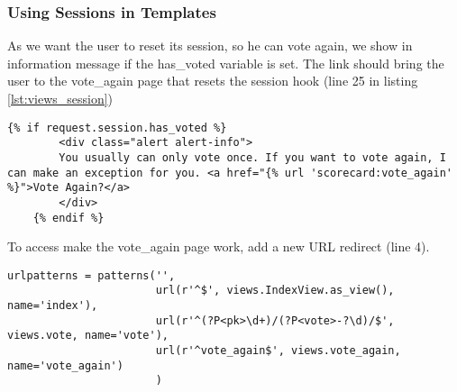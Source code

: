 \subsubsection{Using Sessions in Templates}
As we want the user to reset its session, so he can vote again, we show in information message if the has\_voted variable is set. The link should bring the user to the vote\_again page that resets the session hook (line 25 in listing \ref{lst:views_session})
\begin{lstlisting}[style=HTML, caption=index.html, label=lst:index.html1]
    {% if request.session.has_voted %}
        <div class="alert alert-info">
        You usually can only vote once. If you want to vote again, I can make an exception for you. <a href="{% url 'scorecard:vote_again' %}">Vote Again?</a>
        </div>
    {% endif %}
\end{lstlisting}

To access make the vote\_again page work, add a new URL redirect (line 4).
\begin{lstlisting}[style=Python, caption=urls.py, label=lst:urls.py1]
urlpatterns = patterns('',
                       url(r'^$', views.IndexView.as_view(), name='index'),
                       url(r'^(?P<pk>\d+)/(?P<vote>-?\d)/$', views.vote, name='vote'),
                       url(r'^vote_again$', views.vote_again, name='vote_again')
                       )
\end{lstlisting}